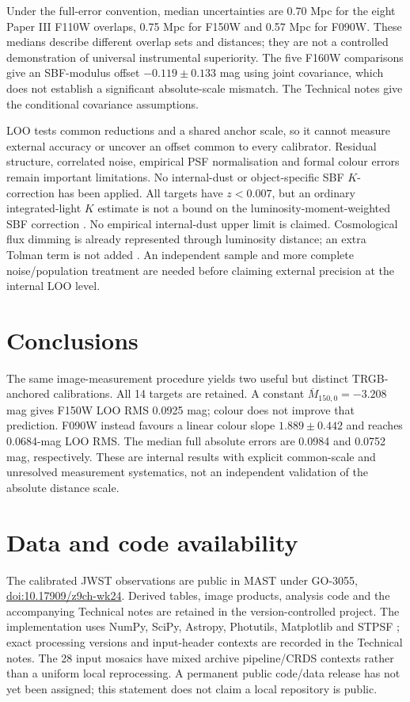 \documentclass[nodoi,nocopyright]{pas}
\newcommand{\Mbar}{\overline{M}}
\begin{document}
Under the full-error convention, median uncertainties are 0.70 Mpc
for the eight Paper III F110W overlaps, 0.75 Mpc for F150W and
0.57 Mpc for F090W. These medians describe different overlap sets
and distances; they are not a controlled demonstration of universal
instrumental superiority. The five F160W comparisons give an
SBF-modulus offset $-0.119\pm0.133$ mag using joint covariance,
which does not establish a significant absolute-scale mismatch.
The Technical notes give the conditional covariance assumptions.

LOO tests common reductions and a shared anchor scale, so it cannot
measure external accuracy or uncover an offset common to every
calibrator. Residual structure, correlated noise, empirical PSF
normalisation and formal colour errors remain important limitations.
No internal-dust or object-specific SBF $K$-correction has been applied.
All targets have $z<0.007$, but an ordinary integrated-light
$K$ estimate is not a bound on the luminosity-moment-weighted SBF
correction \citep{Cervino2008}. No empirical internal-dust upper limit
is claimed. Cosmological flux dimming is already represented through
luminosity distance; an extra Tolman term is not added \citep{Hogg1999}.
An independent sample and more complete noise/population treatment
are needed before claiming external precision at the internal LOO level.

\section{Conclusions}

The same image-measurement procedure yields two useful but distinct
TRGB-anchored calibrations. All 14 targets are retained.
A constant $\Mbar_{150,0}=-3.208$ mag gives F150W LOO RMS
0.0925 mag; colour does not improve that prediction.
F090W instead favours a linear colour slope $1.889\pm0.442$ and
reaches 0.0684-mag LOO RMS. The median full absolute errors are
0.0984 and 0.0752 mag, respectively. These are internal results with
explicit common-scale and unresolved measurement systematics,
not an independent validation of the absolute distance scale.

\section{Data and code availability}

The calibrated JWST observations are public in MAST under GO-3055,
\href{https://doi.org/10.17909/z9ch-wk24}{doi:10.17909/z9ch-wk24}.
Derived tables, image products, analysis code and the accompanying
Technical notes are retained in the version-controlled project.
The implementation uses NumPy, SciPy, Astropy, Photutils,
Matplotlib and STPSF \citep{Harris2020,Virtanen2020,Astropy2022,
Hunter2007,Perrin2014}; exact processing versions and input-header
contexts are recorded in the Technical notes. The 28 input mosaics
have mixed archive pipeline/CRDS contexts rather than a uniform local
reprocessing. A permanent public code/data release has not yet been
assigned; this statement does not claim a local repository is public.
\end{document}
